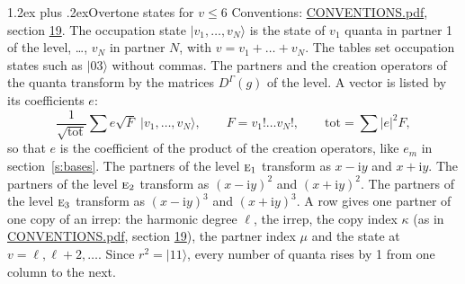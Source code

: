 \documentclass[10pt,a4paper]{article}
\makeatletter
\renewcommand\section{\@startsection{section}{1}{\z@}{-3ex plus -1ex minus -.2ex}%
  {1.2ex plus .2ex}{\normalfont\large\sffamily\bfseries\color{parttitle}}}
\numberwithin{equation}{section}
\newcommand{\irr}[1]{\text{\normalfont\scshape #1}}
\newcommand{\iunit}{\mathrm{i}}
\newcommand{\repD}[1]{D^{#1}}
\newcommand{\mult}{\kappa}
\newcommand{\intx}{\mu}
\newcommand{\occ}[1]{\lvert #1\rangle}
\makeatother
\begin{document}
\section{Overtone states for \texorpdfstring{$v \le 6$}{v \textleq\ 6}}\label{s:overtone_states}
Conventions: \href{../../CONVENTIONS.pdf}{CONVENTIONS.pdf}, section \href{../../CONVENTIONS.pdf\#conv.19}{19}.
\leavevmode\label{n:vector.occupation}\label{n:local.quanta.partner}\label{n:local.weight.occupation}The occupation state $\occ{v_1, \dots, v_N}$ is the state of $v_1$ quanta in partner 1 of the level, \dots, $v_N$ in partner $N$, with $v = v_1 + \dots + v_N$. The tables set occupation states such as $\occ{03}$ without commas. The partners and the creation operators of the quanta transform by the matrices $\repD{\Gamma}(g)$ of the level. A vector is listed by its coefficients $e$:
\begin{equation}\label{e:occupation}\frac{1}{\sqrt{\mathrm{tot}}}\sum e\sqrt{F}\;\occ{v_1, \dots, v_N},\qquad F = v_1!\dots v_N!,\qquad \mathrm{tot} = \sum |e|^2F,\end{equation}
so that $e$ is the coefficient of the product of the creation operators, like $e_m$ in section~\ref{s:bases}. The partners of the level $\irr{e}_{1}$ transform as $x - \iunit y$ and $x + \iunit y$. The partners of the level $\irr{e}_{2}$ transform as $(x - \iunit y)^{2}$ and $(x + \iunit y)^{2}$. The partners of the level $\irr{e}_{3}$ transform as $(x - \iunit y)^{3}$ and $(x + \iunit y)^{3}$. A row gives one partner of one copy of an irrep: the harmonic degree $\ell$, the irrep, the copy index $\mult$ (as in \href{../../CONVENTIONS.pdf}{CONVENTIONS.pdf}, section \href{../../CONVENTIONS.pdf\#conv.19}{19}), the partner index $\intx$ and the state at $v = \ell, \ell + 2, \dots$. Since $r^2 = \occ{11}$, every number of quanta rises by 1 from one column to the next.
\end{document}
